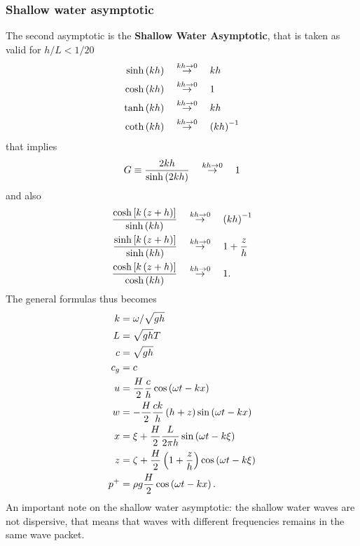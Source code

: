 \subsubsection*{Shallow water asymptotic}
The second asymptotic is the \textbf{Shallow Water Asymptotic}, that is taken as valid for $h/L<1/20$
\begin{align*}
\sinh\left( kh \right)&\quad\overset{kh\rightarrow 0}{\rightarrow}\quad kh\\
\cosh\left( kh \right)&\quad\overset{kh\rightarrow 0}{\rightarrow}\quad 1\\
\tanh\left( kh \right)&\quad\overset{kh\rightarrow 0}{\rightarrow}\quad kh\\
\coth\left( kh \right)&\quad\overset{kh\rightarrow 0}{\rightarrow}\quad \left( kh \right)^{-1}
\end{align*}
that implies 
\begin{equation*}
G\equiv \dfrac{2kh}{\sinh\left( 2kh \right)}\quad\overset{kh\rightarrow 0}{\rightarrow}\quad 1
\end{equation*}
and also
\begin{align*}
\dfrac{\cosh\left[ k\left( z+h \right) \right]}{\sinh\left( kh \right)}&\quad\overset{kh\rightarrow 0}{\rightarrow}\quad \left( kh \right)^{-1}\\
\dfrac{\sinh\left[ k\left( z+h \right) \right]}{\sinh\left( kh \right)}&\quad\overset{kh\rightarrow 0}{\rightarrow}\quad 1+\dfrac{z}{h}\\
\dfrac{\cosh\left[ k\left( z+h \right) \right]}{\cosh\left( kh \right)}&\quad\overset{kh\rightarrow 0}{\rightarrow}\quad 1.
\end{align*}
The general formulas thus becomes
\begin{align}
k&=\omega/\sqrt{gh}\\
L&=\sqrt{gh}T\\
c&=\sqrt{gh}\\
c_{g}&=c\\
u&=\dfrac{H}{2}\dfrac{c}{h}\cos\left( \omega t -kx \right)\\
w&=-\dfrac{H}{2}\dfrac{ck}{h}\left( h+z \right)\sin\left( \omega t -kx \right)\\
x&=\xi + \dfrac{H}{2}\dfrac{L}{2\pi h}\sin\left( \omega t-k\xi \right)\\
z&=\zeta+\dfrac{H}{2}\left( 1+\dfrac{z}{h} \right)\cos\left( \omega t-k\xi \right)\\
p^{+}&=\rho g\dfrac{H}{2}\cos\left( \omega t -kx \right).
\end{align}
An important note on the shallow water asymptotic: the shallow water waves are not dispersive, that means that waves with different frequencies remains in the same wave packet.
